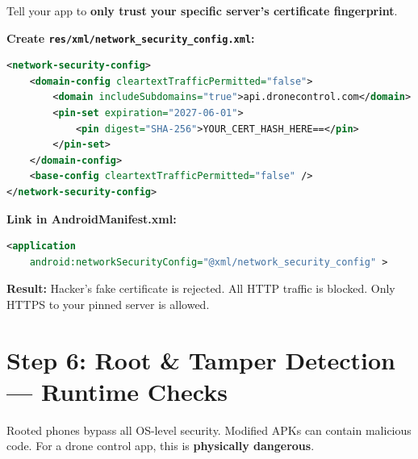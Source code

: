 \documentclass[11pt,a4paper]{article}
\begin{document}
\begin{solutionbox}
Tell your app to \textbf{only trust your specific server's certificate fingerprint}.

\textbf{Create \texttt{res/xml/network\_security\_config.xml}:}
\begin{lstlisting}[language=XML]
<network-security-config>
    <domain-config cleartextTrafficPermitted="false">
        <domain includeSubdomains="true">api.dronecontrol.com</domain>
        <pin-set expiration="2027-06-01">
            <pin digest="SHA-256">YOUR_CERT_HASH_HERE==</pin>
        </pin-set>
    </domain-config>
    <base-config cleartextTrafficPermitted="false" />
</network-security-config>
\end{lstlisting}

\textbf{Link in AndroidManifest.xml:}
\begin{lstlisting}[language=XML]
<application
    android:networkSecurityConfig="@xml/network_security_config" >
\end{lstlisting}

\textbf{Result:} Hacker's fake certificate is rejected. All HTTP traffic is blocked. Only HTTPS to your pinned server is allowed.
\end{solutionbox}

\section{Step 6: Root \& Tamper Detection --- Runtime Checks}

\begin{problembox}
Rooted phones bypass all OS-level security. Modified APKs can contain malicious code. For a drone control app, this is \textbf{physically dangerous}.
\end{problembox}
\end{document}
